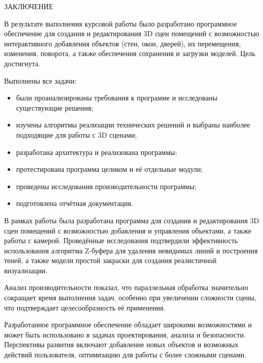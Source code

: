 \begin{center}
    \MakeUppercase{\large Заключение}
\end{center}

В результате выполнения курсовой работы было разработано программное обеспечение для создания и редактирования 3D сцен помещений с возможностью интерактивного добавления объектов (стен, окон, дверей), их перемещения, изменения, поворота, а также обеспечения сохранения и загрузки моделей. Цель достигнута.

\vspace{0.25cm}
Выполнены все задачи:

\begin{itemize}[label=---]

	\item были проанализированы требования к программе и исследованы существующие решения;
    
    \item изучены алгоритмы реализации технических решений и выбраны наиболее подходящие для работы с 3D сценами;
    
    \item разработана архитектура и реализована программы;
    
    \item протестирована программа целиком и её отдельные модули;
    
    \item проведены исследования производительности программы;
    
    \item подготовлена отчётная документация.

\end{itemize}


В рамках работы была разработана программа для создания и редактирования 3D сцен помещений с возможностью добавления и управления объектами, а также работы с камерой. Проведённые исследования подтвердили эффективность использования алгоритма Z-буфера для удаления невидимых линий и построения теней, а также модели простой закраски для создания реалистичной визуализации.

Анализ производительности показал, что параллельная обработка значительно сокращает время выполнения задач, особенно при увеличении сложности сцены, что подтверждает целесообразность её применения.

Разработанное программное обеспечение обладает широкими возможностями и может быть использовано в задачах проектирования, анализа и безопасности. Перспективы развития включают добавление новых объектов и возможных действий пользователя, оптимизацию для работы с более сложными сценами.

\newpage
